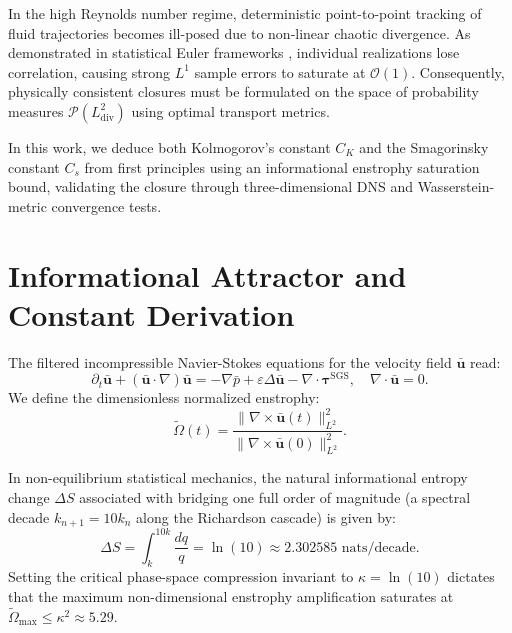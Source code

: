 \documentclass[twocolumn,10pt,aps,pre,superscriptaddress]{revtex4-2}
\begin{document}
In the high Reynolds number regime, deterministic point-to-point tracking of fluid trajectories becomes ill-posed due to non-linear chaotic divergence. As demonstrated in statistical Euler frameworks \cite{FMW24}, individual realizations lose correlation, causing strong $L^1$ sample errors to saturate at $\mathcal{O}(1)$. Consequently, physically consistent closures must be formulated on the space of probability measures $\mathcal{P}(L^2_{\text{div}})$ using optimal transport metrics.

In this work, we deduce both Kolmogorov's constant $C_K$ and the Smagorinsky constant $C_s$ from first principles using an informational enstrophy saturation bound, validating the closure through three-dimensional DNS and Wasserstein-metric convergence tests.

\section{Informational Attractor and Constant Derivation}
The filtered incompressible Navier-Stokes equations for the velocity field $\mathbf{\bar{u}}$ read:
\begin{equation}
\partial_t \mathbf{\bar{u}} + (\mathbf{\bar{u}}\cdot\nabla)\mathbf{\bar{u}} = -\nabla \bar{p} + \varepsilon \Delta \mathbf{\bar{u}} - \nabla \cdot \boldsymbol{\tau}^{\text{SGS}}, \quad \nabla \cdot \mathbf{\bar{u}} = 0.
\end{equation}
We define the dimensionless normalized enstrophy:
\begin{equation}
\widetilde{\Omega}(t) = \frac{\|\nabla \times \mathbf{\bar{u}}(t)\|_{L^2}^2}{\|\nabla \times \mathbf{\bar{u}}(0)\|_{L^2}^2}.
\end{equation}

In non-equilibrium statistical mechanics, the natural informational entropy change $\Delta S$ associated with bridging one full order of magnitude (a spectral decade $k_{n+1} = 10 k_n$ along the Richardson cascade) is given by:
\begin{equation}
\Delta S = \int_{k}^{10k} \frac{dq}{q} = \ln(10) \approx 2.302585 \text{ nats/decade}.
\end{equation}
Setting the critical phase-space compression invariant to $\kappa = \ln(10)$ dictates that the maximum non-dimensional enstrophy amplification saturates at $\widetilde{\Omega}_{\max} \le \kappa^2 \approx 5.29$.
\end{document}
